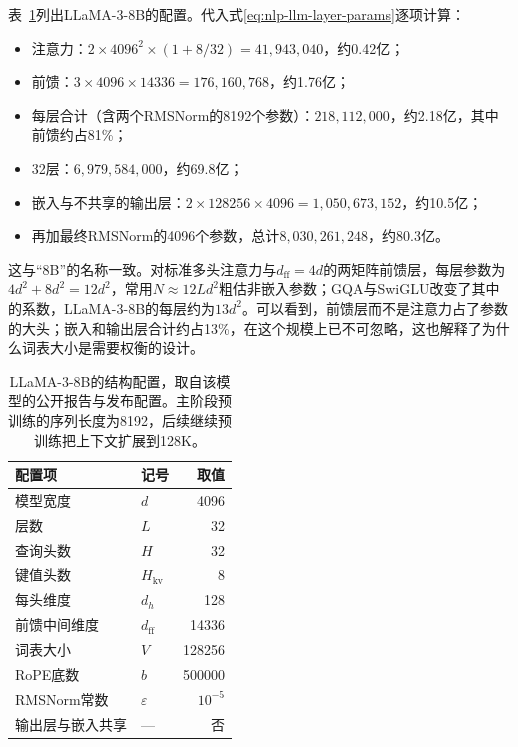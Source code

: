 表~\ref{tab:nlp-llm-llama3-config}列出LLaMA-3-8B的配置。代入式\eqref{eq:nlp-llm-layer-params}逐项计算：
\begin{itemize}
  \item 注意力：$2\times4096^2\times(1+8/32)=41{,}943{,}040$，约0.42亿；
  \item 前馈：$3\times4096\times14336=176{,}160{,}768$，约1.76亿；
  \item 每层合计（含两个RMSNorm的8192个参数）：$218{,}112{,}000$，约2.18亿，其中前馈约占81\%；
  \item 32层：$6{,}979{,}584{,}000$，约69.8亿；
  \item 嵌入与不共享的输出层：$2\times128256\times4096=1{,}050{,}673{,}152$，约10.5亿；
  \item 再加最终RMSNorm的4096个参数，总计$8{,}030{,}261{,}248$，约80.3亿。
\end{itemize}
这与“8B”的名称一致。对标准多头注意力与$d_{\mathrm{ff}}=4d$的两矩阵前馈层，每层参数为$4d^2+8d^2=12d^2$，常用$N\approx12Ld^2$粗估非嵌入参数；GQA与SwiGLU改变了其中的系数，LLaMA-3-8B的每层约为$13d^2$。可以看到，前馈层而不是注意力占了参数的大头；嵌入和输出层合计约占13\%，在这个规模上已不可忽略，这也解释了为什么词表大小是需要权衡的设计。

\begin{table}[htbp]
  \centering
  \begin{tabular}{@{}llr@{}}
    \toprule
    配置项 & 记号 & 取值\\
    \midrule
    模型宽度 & $d$ & 4096\\
    层数 & $L$ & 32\\
    查询头数 & $H$ & 32\\
    键值头数 & $H_{\mathrm{kv}}$ & 8\\
    每头维度 & $d_h$ & 128\\
    前馈中间维度 & $d_{\mathrm{ff}}$ & 14336\\
    词表大小 & $V$ & 128256\\
    RoPE底数 & $b$ & 500000\\
    RMSNorm常数 & $\varepsilon$ & $10^{-5}$\\
    输出层与嵌入共享 & --- & 否\\
    \bottomrule
  \end{tabular}
  \caption{LLaMA-3-8B的结构配置，取自该模型的公开报告与发布配置。主阶段预训练的序列长度为8192，后续继续预训练把上下文扩展到128K。}
  \label{tab:nlp-llm-llama3-config}
\end{table}

